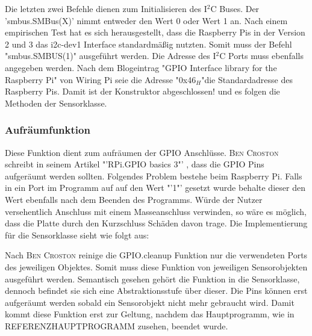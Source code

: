 	Die letzten zwei Befehle dienen zum Initialisieren des I$^2$C Buses. Der 'smbus.SMBus(X)' nimmt entweder den Wert 0 oder Wert 1 an. Nach einem empirischen Test hat es sich herausgestellt, dass die Raspberry Pis in der Version 2 und 3 das i2c-dev1 Interface standardmäßig nutzten. Somit muss der Befehl "smbus.SMBUS(1)" ausgeführt werden. Die Adresse des I$^2$C Ports muss ebenfalls angegeben werden. Nach dem Blogeintrag "GPIO Interface library for the Raspberry Pi"\cite{I2CPCF8592:online} von Wiring Pi seie die Adresse "0x46$_H$"\space die Standardadresse des Raspberry Pis. Damit ist der Konstruktor abgeschlossen! und es folgen die Methoden der Sensorklasse.
\subsubsection*{Aufräumfunktion}
	Diese Funktion dient zum aufräumen der \ac{GPIO} Anschlüsse. \textsc{Ben Croston} schreibt in seinem Artikel "'RPi.GPIO basics 3"' \cite{RPiGPIOb90:online}, dass die \ac{GPIO} Pins aufgeräumt werden sollten. Folgendes Problem bestehe beim Raspberry Pi. Falls in ein Port im Programm auf auf den Wert "'1"' gesetzt wurde behalte dieser den Wert ebenfalls nach dem Beenden des Programms. Würde der Nutzer versehentlich Anschluss mit einem Masseanschluss verwinden, so wäre es möglich, dass die Platte durch den Kurzschluss Schäden davon trage. Die Implementierung für die Sensorklasse sieht wie folgt aus:
	
	Nach \textsc{Ben Croston} \cite{RPiGPIOb90:online} reinige die GPIO.cleanup Funktion nur die verwendeten Ports des jeweiligen Objektes. Somit muss diese Funktion von jeweiligen Sensorobjekten ausgeführt werden. Semantisch gesehen gehört die Funktion in die Sensorklasse, dennoch befindet sie sich eine Abstraktionsstufe über dieser. Die Pins können erst aufgeräumt werden sobald ein Sensorobjekt nicht mehr gebraucht wird. Damit kommt diese Funktion erst zur Geltung, nachdem das Hauptprogramm, wie in REFERENZHAUPTPROGRAMM zusehen,
	beendet wurde.

